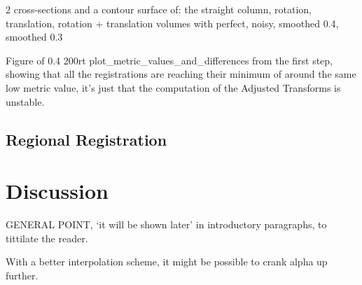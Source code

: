   \begin{figure}
    \centering
    \caption{}
    \label{fig:image1.png}
  \end{figure}

  
  
  2 cross-sections and a contour surface of:
    the straight column, rotation, translation, rotation + translation volumes
      with perfect, noisy, smoothed 0.4, smoothed 0.3
        
  Figure of 0.4 200rt plot\_metric\_values\_and\_differences from the first step, showing that all the registrations are reaching their minimum of around the same low metric value, it's just that the computation of the Adjusted Transforms is unstable.
  
  
  
  
  \subsection{Regional Registration} %
  \label{sub:regional_registration}
  


\section{Discussion} %
\label{sec:discussion}
  GENERAL POINT, `it will be shown later' in introductory paragraphs, to tittilate the reader.

  With a better interpolation scheme, it might be possible to crank alpha up further.
  
